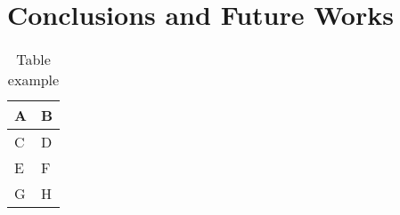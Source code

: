 
\chapter{Conclusions and Future Works}\label{ch:conclusions}

\begin{table}[ht]
    \centering
    \begin{tabular}{|l|l|}
    \hline
    \textbf{A} & \textbf{B} \\ \hline
    C          & D          \\ \hline
    E          & F          \\ \hline
    G          & H          \\ \hline
    \end{tabular}
    \caption{Table example \label{tab:table-name}}
\end{table}